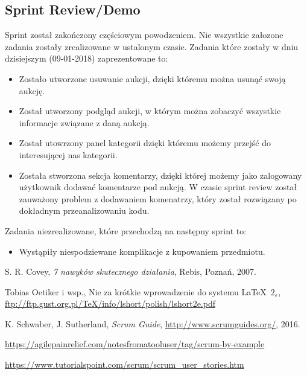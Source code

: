 \documentclass[a4paper]{article}
\begin{document}
	\subsection{Sprint Review/Demo}
	Sprint został zakończony częściowym powodzeniem. Nie wszystkie załozone zadania zostały zrealizowane w ustalonym czasie. Zadania które zostały w dniu dzisiejszym (09-01-2018) zaprezentowane to:
	
\begin{itemize}

\item Zostało utworzone usuwanie aukcji, dzięki któremu można usunąć swoją aukcję.
\item Został utworzony podgląd aukcji, w którym można zobaczyć wszystkie informacje związane z daną aukcją.
\item Został utowrzony panel kategorii dzięki któremu możemy przejść do interesującej nas kategorii.
\item Została stworzona sekcja komentarzy, dzięki której możemy jako zalogowany użytkownik dodawać komentarze pod aukcją. W czasie sprint review został zauważony problem z dodawaniem komenatrzy, który został rozwiązany po dokładnym przeanalizowaniu kodu.
\end{itemize}
	
Zadania niezrealizowane, które przechodzą na następny sprint to:

\begin{itemize}

\item Wystąpiły niespodziewane komplikacje z kupowaniem przedmiotu. 

\end{itemize}
	
	\begin{thebibliography}{9}
		
		 S. R. Covey, {\em 7 nawyków skutecznego działania}, Rebis, Poznań, 2007.
		
		 Tobias Oetiker i wsp., Nie za krótkie wprowadzenie do systemu \LaTeX  \ $2_\varepsilon$, \url{ftp://ftp.gust.org.pl/TeX/info/lshort/polish/lshort2e.pdf}
		
		 K. Schwaber, J. Sutherland, {\em Scrum Guide}, \url{http://www.scrumguides.org/}, 2016.
		
		 \url{https://agilepainrelief.com/notesfromatooluser/tag/scrum-by-example}
		
		 \url{https://www.tutorialspoint.com/scrum/scrum_user_stories.htm}
		
	\end{thebibliography}
	
\end{document}
